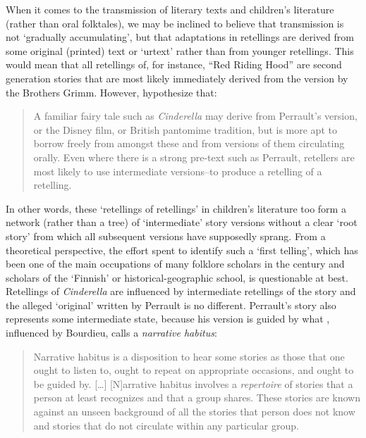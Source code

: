 When it comes to the transmission of literary texts and children's literature (rather than oral folktales), we may be inclined to believe that transmission is not `gradually accumulating', but that adaptations in retellings are derived from some original (printed) text or `urtext' rather than from younger retellings. This would mean that all retellings of, for instance, ``Red Riding Hood'' are second generation stories that are most likely immediately derived from the version by the Brothers Grimm. However, \citeauthor{stephens_mccallum} hypothesize that:
\begin{quotation}
    \noindent A familiar fairy tale such as \emph{Cinderella} may derive from Perrault's version, or the Disney film, or British pantomime tradition, but is more apt to borrow freely from amongst these and from versions of them circulating orally. Even where there is a strong pre-text such as Perrault, retellers are most likely to use intermediate versions--to produce a retelling of a retelling.~\autocite[4]{stephens_mccallum}
\end{quotation}
In other words, these `retellings of retellings' in children's literature too form a network (rather than a tree) of `intermediate' story versions without a clear `root story' from which all subsequent versions have supposedly sprang. From a theoretical perspective, the effort spent to identify such a `first telling', which has been one of the main occupations of many folklore scholars in the  century and scholars of the `Finnish' or historical-geographic school, is questionable at best\autocite[For a more recent example of such effort, see][]{tehrani:2013}. Retellings of \emph{Cinderella} are influenced by intermediate retellings of the story and the alleged `original' written by Perrault is no different. Perrault's story also represents some intermediate state, because his version is guided by what \citeauthor{frank:2010}, influenced by Bourdieu, calls a \emph{narrative habitus}:
\begin{quote}
    Narrative habitus is a disposition to hear some stories as those that one ought to listen to, ought to repeat on appropriate occasions, and ought to be guided by. [\ldots] [N]arrative habitus involves a \emph{repertoire} of stories that a person at least recognizes and that a group shares. These stories are known against an unseen background of all the stories that person does not know and stories that do not circulate within any particular group.\autocite[53]{frank:2010}
\end{quote}
